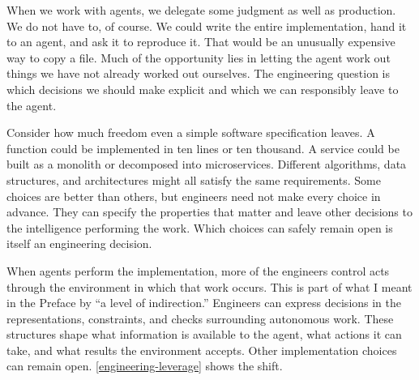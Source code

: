 
When we work with agents, we delegate some judgment as well as production. We do not have to, of course. We could write the entire implementation, hand it to an agent, and ask it to reproduce it. That would be an unusually expensive way to copy a file. Much of the opportunity lies in letting the agent work out things we have not already worked out ourselves. The engineering question is which decisions we should make explicit and which we can responsibly leave to the agent.


Consider how much freedom even a simple software specification leaves. A function could be implemented in ten lines or ten thousand. A service could be built as a monolith or decomposed into microservices. Different algorithms, data structures, and architectures might all satisfy the same requirements. Some choices are better than others, but engineers need not make every choice in advance. They can specify the properties that matter and leave other decisions to the intelligence performing the work. Which choices can safely remain open is itself an engineering decision.


When agents perform the implementation, more of the engineer\textquotesingle s control acts through the environment in which that work occurs. This is part of what I meant in the Preface by “a level of indirection.” Engineers can express decisions in the representations, constraints, and checks surrounding autonomous work. These structures shape what information is available to the agent, what actions it can take, and what results the environment accepts. Other implementation choices can remain open. \autoref{engineering-leverage} shows the shift.


